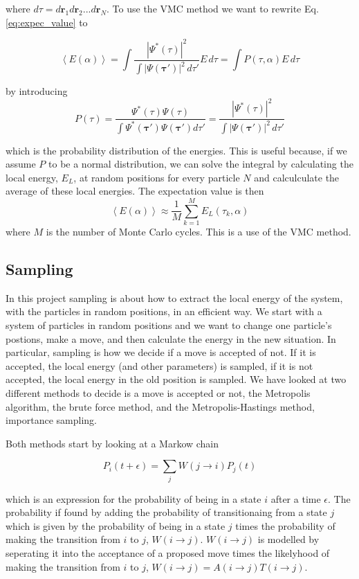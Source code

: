 where $ d\tau = d\mathbf{r}_1d\mathbf{r}_2 ... d\mathbf{r}_N$. To use the VMC method we want to rewrite Eq.  \ref{eq:expec_value} to

\begin{equation}
\left< E(\alpha) \right> = \int \frac{|\Psi^*(\tau)|^2}{\int |\Psi(\mathbf{\tau}')|^2 \,d \tau' }  E\, d\tau = \int P(\tau, \alpha) E\, d\tau
\end{equation}

by introducing 
$$P(\tau) = \frac{\Psi^*(\tau) \Psi(\tau)}{\int \Psi^*(\mathbf{\tau}')\Psi(\mathbf{\tau}') d \tau' } = \frac{|\Psi^*(\tau)|^2}{\int |\Psi(\mathbf{\tau}')|^2 \,d \tau' }$$

which is the probability distribution of the energies. This is useful because, if we assume $P$ to be a normal distribution, we can solve the integral by calculating the local energy, $E_L$, at random positions for every particle $N$ and calculculate the average of these local energies. The expectation value is then 
$$ \left< E(\alpha) \right> \approx \frac{1}{M} \sum_{k=1}^M E_L(\tau_k, \alpha) $$
where $M$ is the number of Monte Carlo cycles. This is a use of the VMC method.

\subsection{Sampling}
In this project sampling is about how to extract the local energy of the system, with the particles in random positions, in an efficient way. We start with a system of particles in random positions and we want to change one particle's postions, make a move, and then calculate the energy in the new situation. In particular, sampling is how we decide if a move is accepted of not. If it is accepted, the local energy (and other parameters) is sampled, if it is not accepted, the local energy in the old position is sampled. We have looked at two different methods to decide is a move is accepted or not, the Metropolis algorithm, the brute force method, and the Metropolis-Hastings method, importance sampling. 

Both methods start by looking at a Markow chain

$$ P_i(t+\epsilon) = \sum_j W(j\rightarrow i) P_j(t) $$

which is an expression for the probability of being in a state $i$ after a time $\epsilon$. The probability if found by adding the probability of transitionaing from a state $j$ which is given by the probability of being in a state $j$ times the probability of making the transition from $i$ to $j$, $W(i\rightarrow j)$. $W(i\rightarrow j)$ is modelled by seperating it into the acceptance of a proposed move times the likelyhood of making the transition from $i$ to $j$, $W(i\rightarrow j) = A(i\rightarrow j)T(i\rightarrow j)$.

